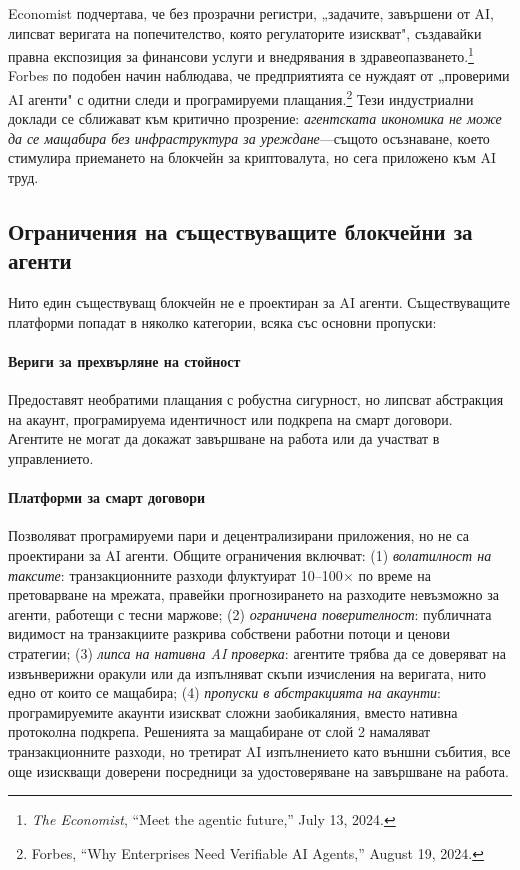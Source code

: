 \documentclass[11pt]{article}
\begin{document}
Economist подчертава, че без прозрачни регистри, „задачите, завършени от AI, липсват веригата на попечителство, която регулаторите изискват", създавайки правна експозиция за финансови услуги и внедрявания в здравеопазването.\footnote{\emph{The Economist}, ``Meet the agentic future,'' July 13, 2024.} Forbes по подобен начин наблюдава, че предприятията се нуждаят от „проверими AI агенти" с одитни следи и програмируеми плащания.\footnote{Forbes, ``Why Enterprises Need Verifiable AI Agents,'' August 19, 2024.} Тези индустриални доклади се сближават към критично прозрение: \emph{агентската икономика не може да се мащабира без инфраструктура за уреждане}---същото осъзнаване, което стимулира приемането на блокчейн за криптовалута, но сега приложено към AI труд.

\subsection{Ограничения на съществуващите блокчейни за агенти}
Нито един съществуващ блокчейн не е проектиран за AI агенти. Съществуващите платформи попадат в няколко категории, всяка със основни пропуски:

\paragraph{Вериги за прехвърляне на стойност} Предоставят необратими плащания с робустна сигурност, но липсват абстракция на акаунт, програмируема идентичност или подкрепа на смарт договори. Агентите не могат да докажат завършване на работа или да участват в управлението.

\paragraph{Платформи за смарт договори} Позволяват програмируеми пари и децентрализирани приложения, но не са проектирани за AI агенти. Общите ограничения включват: (1) \emph{волатилност на таксите}: транзакционните разходи флуктуират 10--100$\times$ по време на претоварване на мрежата, правейки прогнозирането на разходите невъзможно за агенти, работещи с тесни маржове; (2) \emph{ограничена поверителност}: публичната видимост на транзакциите разкрива собствени работни потоци и ценови стратегии; (3) \emph{липса на нативна AI проверка}: агентите трябва да се доверяват на извънверижни оракули или да изпълняват скъпи изчисления на веригата, нито едно от които се мащабира; (4) \emph{пропуски в абстракцията на акаунти}: програмируемите акаунти изискват сложни заобикаляния, вместо нативна протоколна подкрепа. Решенията за мащабиране от слой 2 намаляват транзакционните разходи, но третират AI изпълнението като външни събития, все още изискващи доверени посредници за удостоверяване на завършване на работа.
\end{document}
